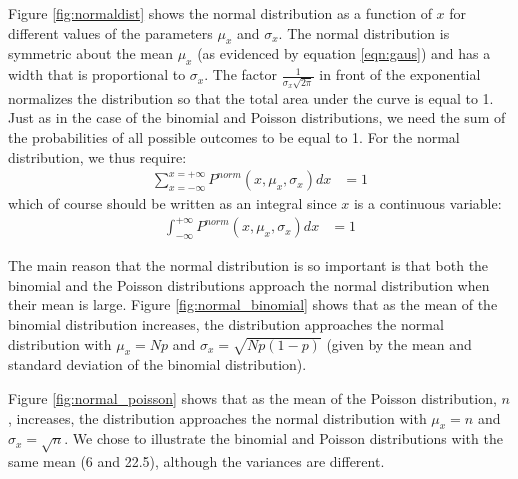 Figure \ref{fig:normaldist} shows the normal distribution as a function of $x$ for different values of the parameters $\mu_x$ and $\sigma_x$. The normal distribution is symmetric about the mean $\mu_x$ (as evidenced by equation \ref{eqn:gaus}) and has a width that is proportional to $\sigma_x$. The factor $\frac{1}{\sigma_x\sqrt{2\pi}}$ in front of the exponential normalizes the distribution so that the total area under the curve is equal to 1. Just as in the case of the binomial and Poisson distributions, we need the sum of the probabilities of all possible outcomes to be equal to 1. For the normal distribution, we thus require:
\begin{align*}
\sum_{x=-\infty}^{x=+\infty}P^{norm}(x,\mu_x,\sigma_x)dx &=1
\end{align*}
which of course should be written as an integral since $x$ is a continuous variable:
\begin{align}
\int_{-\infty}^{+\infty}P^{norm}(x,\mu_x,\sigma_x)dx &=1
\end{align}

The main reason that the normal distribution is so important is that both the binomial and the Poisson distributions approach the normal distribution when their mean is large. Figure \ref{fig:normal_binomial} shows that as the mean of the binomial distribution increases, the distribution approaches the normal distribution with $\mu_x=Np$  and $\sigma_x=\sqrt{Np(1-p)}$ (given by the mean and standard deviation of the binomial distribution).

 Figure \ref{fig:normal_poisson} shows that as the mean of the Poisson distribution, $n$, increases, the distribution approaches the normal distribution with $\mu_x=n$  and $\sigma_x=\sqrt{n}$. We chose to illustrate the binomial and Poisson distributions with the same mean (6 and 22.5), although the variances are different.



